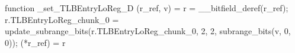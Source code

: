 function _set_TLBEntryLoReg_D (r_ref, v) = {
    r = __bitfield_deref(r_ref);
    r.TLBEntryLoReg_chunk_0 = update_subrange_bits(r.TLBEntryLoReg_chunk_0, 2, 2, subrange_bits(v, 0, 0));
    (*r_ref) = r
}
